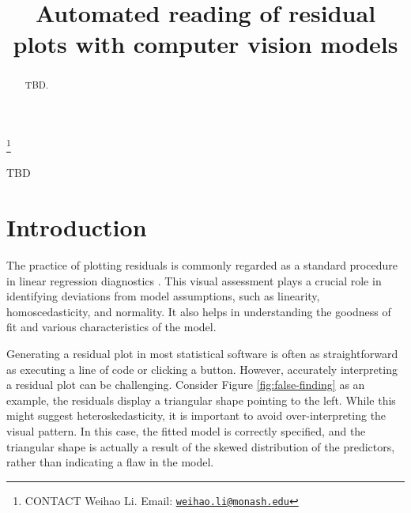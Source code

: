 \documentclass[]{interact}
\theoremstyle{plain}%
\theoremstyle{definition}
\theoremstyle{remark}
\begin{document}

\title{Automated reading of residual plots with computer vision models}


\author{
}

\thanks{CONTACT Weihao
Li. Email: \href{mailto:weihao.li@monash.edu}{\nolinkurl{weihao.li@monash.edu}}}

\maketitle

\begin{abstract}
TBD.
\end{abstract}

\begin{keywords}
TBD
\end{keywords}

\hypertarget{introduction}{%
\section{Introduction}\label{introduction}}

The practice of plotting residuals is commonly regarded as a standard
procedure in linear regression diagnostics
\citep[see][]{cook1982residuals, belsley1980regression}. This visual
assessment plays a crucial role in identifying deviations from model
assumptions, such as linearity, homoscedasticity, and normality. It also
helps in understanding the goodness of fit and various characteristics
of the model.

Generating a residual plot in most statistical software is often as
straightforward as executing a line of code or clicking a button.
However, accurately interpreting a residual plot can be challenging.
Consider Figure \ref{fig:false-finding} as an example, the residuals
display a triangular shape pointing to the left. While this might
suggest heteroskedasticity, it is important to avoid over-interpreting
the visual pattern. In this case, the fitted model is correctly
specified, and the triangular shape is actually a result of the skewed
distribution of the predictors, rather than indicating a flaw in the
model.
\end{document}
